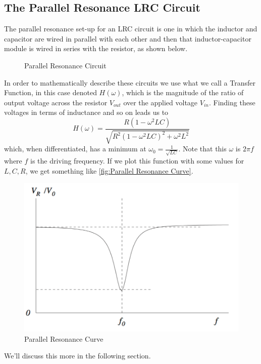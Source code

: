 \documentclass[12pt]{article}
\numberwithin{equation}{section}
\numberwithin{figure}{section}
\begin{document}
    \subsection{The Parallel Resonance LRC Circuit}\label{sec:Parallel Resonance}
    The parallel resonance set-up for an LRC circuit is one in which the inductor and capacitor are 
    wired in parallel with each other and then that inductor-capacitor module is wired in series with 
    the resistor, as shown below. 
    \begin{figure}[H]
        \centering
            \def\svgwidth{0.5\textwidth}
            
            \caption{Parallel Resonance Circuit}
            \label{fig:Parallel Resonance Circuit}
    \end{figure}
    In order to mathematically describe these circuits we use what we call a Transfer Function, in this 
    case denoted $H(\omega)$, which is the magnitude of the ratio of output voltage across the resistor 
    $V_{out}$ over the applied voltage $V_{in}$. Finding these voltages in terms of inductance and so 
    on leads us to 
    \begin{equation}
        H(\omega)=\frac{R(1-\omega^2LC)}{\sqrt{R^2(1-\omega^2LC)^2+\omega^2L^2}}
        \label{eqn:Parallel Transfer Function}
    \end{equation}
    which, when differentiated, has a minimum at $\omega_0=\frac{1}{\sqrt{LC}}$. Note that this $\omega$ 
    is $2\pi f$ where $f$ is the driving frequency. If we plot this function with some values for 
    $L,C,R$, we get something like \autoref{fig:Parallel Resonance Curve}.
    \begin{figure}[H]
        \begin{center}
           \includegraphics[width=.65\textwidth]{ParallelResonanceCurve.png}
           \caption{Parallel Resonance Curve}
           \label{fig:Parallel Resonance Curve}
        \end{center}
    \end{figure}
    We'll discuss this more in the following section.
\end{document}
